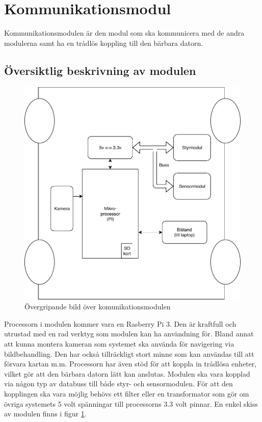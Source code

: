 \documentclass[systemskiss/skiss.tex]{subfiles}
\begin{document}
\section{Kommunikationsmodul}
Kommunikationsmodulen är den modul som ska kommunicera med de andra modulerna samt ha en trådlös koppling till den bärbara datorn. 
\subsection{Översiktlig beskrivning av modulen}
\begin{figure}[h]
    \centering
    \includegraphics[width=0.6\linewidth]{systemskiss/figures/kommodul.pdf}
    \caption{Övergripande bild över komunikationsmodulen}
    \label{fig:komskiss}
\end{figure}
Processorn i modulen kommer vara en Rasberry Pi 3. Den är kraftfull och utrustad med en rad verktyg som modulen kan ha användning för. Bland annat att kunna montera kameran som systemet ska använda för navigering via bildbehandling. Den har också tillräckligt stort minne som kan användas till att förvara kartan m.m. Processorn har även stöd för att koppla in trådlösa enheter, vilket gör att den bärbara datorn lätt kan anslutas. Modulen ska vara kopplad via någon typ av databuss till både styr- och sensormodulen. För att den kopplingen  ska vara möjlig behövs ett filter eller en transformator som gör om övriga systemets 5 volt spänningar till processorns 3.3 volt pinnar. En enkel skiss av modulen finns i figur \ref{fig:komskiss}.
\end{document}
